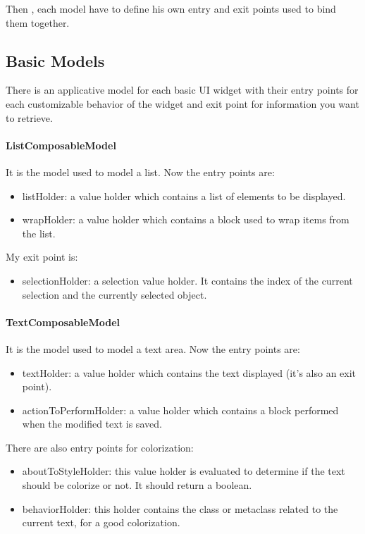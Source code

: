 \documentclass[a4paper,10pt,twoside]{book}
\begin{document}
Then , each model have to define his own entry and exit points used to bind them together.

\subsection{Basic Models}

There is an applicative model for each basic UI widget  with their entry points for each customizable behavior of the widget and exit point for information you want to retrieve.  

\paragraph{ListComposableModel} It is the model used to model a list.
Now the entry points are:
\begin{itemize}
	\item listHolder: a value holder which contains a list of elements to be displayed.
	\item wrapHolder: a value holder which contains a block used to wrap items from the list.
\end{itemize}
My exit point is:
\begin{itemize}
	\item selectionHolder: a selection value holder. It contains the index of the current selection and the currently selected object.
\end{itemize}

\paragraph{TextComposableModel} It is the model used to model a text area.
Now the entry points are:
\begin{itemize}
	\item textHolder: a value holder which contains the text displayed (it's also an exit point).
	\item actionToPerformHolder: a value holder which contains a block performed when the modified text is saved.
\end{itemize}
There are also entry points for colorization:
\begin{itemize}	
	\item aboutToStyleHolder: this value holder is evaluated to determine if the text should be colorize or not. It should return a boolean.
	\item behaviorHolder: this holder contains the class or metaclass related to the current text, for a good colorization.
\end{itemize}
\end{document}
